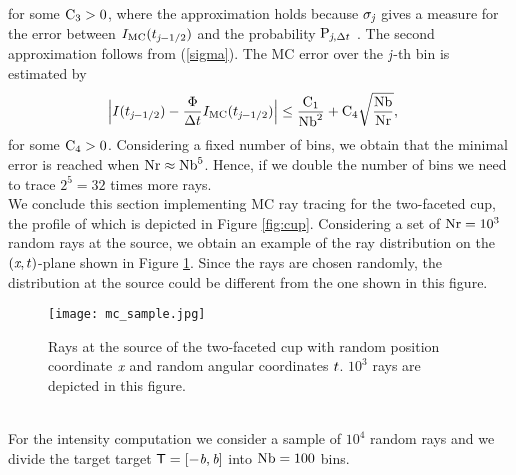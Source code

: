 for some $\textrm{C}_3>0$, where the approximation holds because $\sigma_{\textit{j}}$ gives a measure for the error between
$I_{\textrm{MC}}(t_{\textit{j}-1/2})$ and the probability $\textrm{P}_{\textit{j}, \Delta t}$ \cite{diez2012openintro}. The second approximation follows from (\ref{sigma}). The MC error over the $\textit{j}$-th bin is estimated by
\begin{equation} \begin{aligned}
\Big|I(t_{\textit{j}-1/2})&-\frac{\Phi}
{\Delta t}I_{\textrm{MC}}(t_{\textit{j}-1/2})\Big| \leq
\frac{\textrm{C}_1}{\textrm{Nb}^2} + \textrm{C}_4\sqrt{\frac{\textrm{Nb}}{\textrm{Nr}}},
\end{aligned}
\end{equation}
for some $\textrm{C}_4>0$.
Considering a fixed number of bins, we obtain that the minimal error is reached when $\textrm{Nr}\approx \textrm{Nb}^5$.
Hence, if we double the number of bins we need to trace $2^5 = 32$ times more rays.\\ \indent
We conclude this section implementing MC ray tracing for the two-faceted cup, the profile of which is depicted in Figure \ref{fig:cup}. 
Considering a set of $\textrm{Nr} = 10^3$ random rays 
at the source, we obtain an example of the ray distribution on the $(\textit{x}, t)$-plane shown in Figure \ref{fig:mc_sample1}. 
Since the rays are chosen randomly, the distribution at the source could be different from the one shown in this figure.
\begin{figure}[h]
\begin{center}
    \texttt{[image: mc\_sample.jpg]}
    \caption{Rays at the source of the two-faceted cup with random position coordinate $\textit{x}$ and random angular coordinates $t$. $10^3$ rays are depicted in this figure.}
    \label{fig:mc_sample1}
\end{center}
  \end{figure}
\\ \indent For the intensity computation we consider a sample of $10^4$ random rays and we divide the target target $\textsf{T} = [-\textit{b}, \textit{b}]$ into $\textrm{Nb}= 100$ bins.
